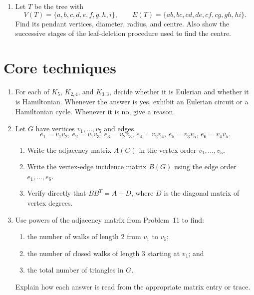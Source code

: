 \documentclass[svgnames]{amsart}
\begin{document}
\begin{enumerate}
\item Let $T$ be the tree with
\begin{equation*}
V(T)=\{a,b,c,d,e,f,g,h,i\},\qquad
E(T)=\{ab,bc,cd,de,cf,cg,gh,hi\}.
\end{equation*}
Find its pendant vertices, diameter, radius, and centre. Also show the
successive stages of the leaf-deletion procedure used to find the centre.

\end{enumerate}

\section*{Core techniques}

\begin{enumerate}[resume]

\item For each of $K_5$, $K_{2,4}$, and $K_{3,3}$, decide whether it is Eulerian and whether it is Hamiltonian. Whenever the answer is yes, exhibit an Eulerian circuit or a Hamiltonian cycle. Whenever it is no, give a reason.

\item Let $G$ have vertices $v_1,\ldots,v_5$ and edges
\begin{equation*}
e_1=v_1v_2,\, e_2=v_1v_3,\, e_3=v_2v_3,\, e_4=v_2v_4,\, e_5=v_3v_5,\, e_6=v_4v_5.
\end{equation*}

\begin{enumerate}
  \item Write the adjacency matrix $A(G)$ in the vertex order $v_1, \ldots, v_5$.
  \item Write the vertex-edge incidence matrix $B(G)$ using the edge order $e_1,\ldots,e_6$.
  \item Verify directly that $BB^{T} = A + D$, where $D$ is the diagonal matrix of vertex degrees.
\end{enumerate}

\item Use powers of the adjacency matrix from Problem~11 to find:
\begin{enumerate}
  \item the number of walks of length $2$ from $v_1$ to $v_5$;
  \item the number of closed walks of length $3$ starting at $v_1$; and
  \item the total number of triangles in $G$.
\end{enumerate}
Explain how each answer is read from the appropriate matrix entry or trace.


\end{enumerate}
\end{document}
